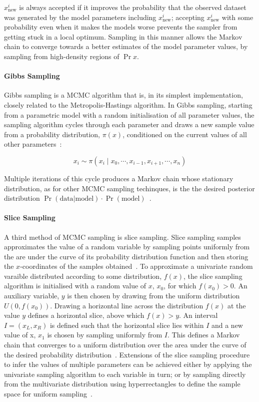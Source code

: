 $x^i_{\text{new}}$ is always accepted if it improves the probability that the observed dataset was generated by the model parameters including $x^i_{\text{new}}$; accepting $x^i_{\text{new}}$ with some probability even when it makes the models worse prevents the sampler from getting stuck in a local optimum. Sampling in this manner allows the Markov chain to converge towards a better estimates of the model parameter values, by sampling from high-density regions of $\Pr{x}$.

\paragraph{Gibbs Sampling}
Gibbs sampling is a MCMC algorithm that is, in its simplest implementation, closely related to the Metropolis-Hastings algorithm. In Gibbs sampling, starting from a parametric model with a random initialisation of all parameter values, the sampling algorithm cycles through each parameter and draws a new sample value from a probability distribution, $\pi(x)$, conditioned on the current values of all other parameters~\cite{Smith1993}:

\begin{equation}
x_i \sim \pi(x_i \mid x_0, \cdots, x_{i-1}, x_{i+1}, \cdots, x_n)
\label{eq:gibbs}
\end{equation} 

Multiple iterations of this cycle produces a Markov chain whose stationary distribution, as for other MCMC sampling techinques, is the the desired posterior distribution $\Pr(\text{data}|\text{model}) \cdot \Pr(\text{model})$~\cite{gelman1995}.

\paragraph{Slice Sampling}
A third method of MCMC sampling is slice sampling. Slice sampling samples approximates the value of a random variable by sampling points uniformly from the are under the curve of its probability distribution function and then storing the $x$-coordinates of the samples obtained~\cite{Neal2003}. To approximate a univariate random varaible distributed according to some distribution, $f(x)$, the slice sampling algorithm is initialised with a random value of $x$, $x_0$, for which $f(x_0) > 0$. An auxiliary variable, $y$ is then chosen by drawing from the uniform distribution $U(0, f(x_0))$. Drawing a horizontal line across the distribution $f(x)$ at the value $y$ defines a horizontal slice, above which $f(x) > y$. An interval $I = (x_L, x_R)$ is defined such that the horizontal slice lies within $I$ and a new value of x, $x_1$ is chosen by sampling uniformly from $I$. This defines a Markov chain that converges to a uniform distribution over the area under the curve of the desired probability distribution~\cite{Neal2003}. Extensions of the slice sampling procedure to infer the values of multiple parameters can be achieved either by applying the univariate sampling algorithm to each variable in turn; or by sampling directly from the multivariate distribution using hyperrectangles to define the sample space for uniform sampling~\cite{Neal2003}. 

